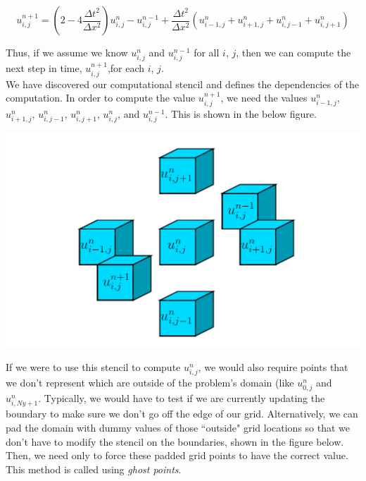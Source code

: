 \documentclass[12pt]{article}
\begin{document}
\begin{equation}
u^{n+1}_{i,j} =\left(2-4 \frac{\Delta t^2}{\Delta x^2}\right)u^n_{i,j} - u^{n-1}_{i,j} + \frac{\Delta t^2}{\Delta x^2}(u^n_{i-1,j} + u^n_{i+1,j} + u^n_{i,j-1} + u^n_{i,j+1})
\end{equation}

Thus, if we assume we know $u^{n}_{i,j}$ and $u^{n-1}_{i,j}$ for all $i$, $j$, then we can compute the next step in time, $u^{n+1}_{i,j}$,for each $i$, $j$. \\

We have discovered our computational stencil and defines the dependencies of the computation.  In order to compute the value $u^{n+1}_{i,j}$, we need the values $u^{n}_{i-1,j}$, $u^{n}_{i+1,j}$, $u^{n}_{i,j-1}$, $u^{n}_{i,j+1}$, $u^{n}_{i,j}$, and $u^{n-1}_{i,j}$.  This is shown in the below figure.

\begin{center}
\includegraphics[scale=0.9]{stencil}
\end{center}

If we were to use this stencil to compute $u^{n}_{i,j}$, we would also require points that we don't represent which are outside of the problem's domain (like $u^n_{0,j}$ and $u^n_{i,Ny+1}$.  Typically, we would have to test if we are currently updating the boundary to make sure we don't go off the edge of our grid.  Alternatively, we can pad the domain with dummy values of those ``outside" grid locations so that we don't have to modify the stencil on the boundaries, shown in the figure below.  Then, we need only to force these padded grid points to have the correct value.  This method is called using \textit{ghost points}.
\end{document}

